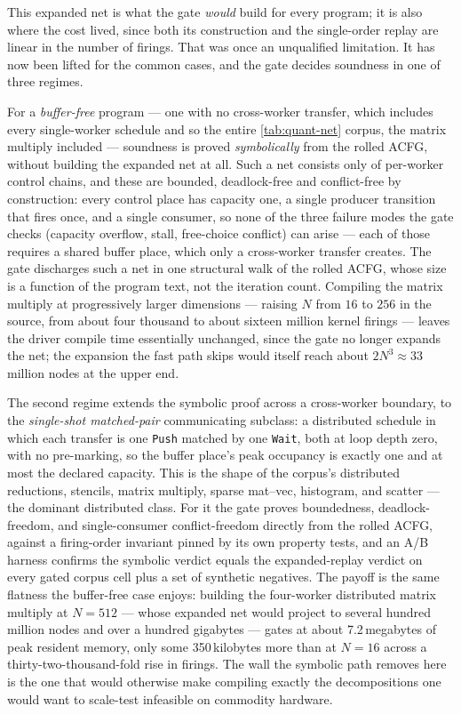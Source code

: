 This expanded net is what the gate \emph{would} build for every program; it is also
where the cost lived, since both its construction and the single-order replay are
linear in the number of firings. That was once an unqualified limitation. It has now
been lifted for the common cases, and the gate decides soundness in one of three regimes.

For a \emph{buffer-free} program --- one with no cross-worker transfer, which includes
every single-worker schedule and so the entire \cref{tab:quant-net} corpus, the matrix
multiply included --- soundness is proved \emph{symbolically} from the rolled ACFG,
without building the expanded net at all. Such a net consists only of per-worker control
chains, and these are bounded, deadlock-free and conflict-free by construction: every
control place has capacity one, a single producer transition that fires once, and a
single consumer, so none of the three failure modes the gate checks (capacity overflow,
stall, free-choice conflict) can arise --- each of those requires a shared buffer place,
which only a cross-worker transfer creates. The gate discharges such a net in one
structural walk of the rolled ACFG, whose size is a function of the program text, not the
iteration count. Compiling the matrix multiply at progressively larger dimensions ---
raising $N$ from $16$ to $256$ in the source, from about four thousand to about sixteen
million kernel firings --- leaves the driver compile time essentially unchanged, since
the gate no longer expands the net; the expansion the fast path skips would itself reach
about $2N^3 \approx 33$ million nodes at the upper end.

The second regime extends the symbolic proof across a cross-worker boundary, to the
\emph{single-shot matched-pair} communicating subclass: a distributed schedule in which
each transfer is one \texttt{Push} matched by one \texttt{Wait}, both at loop depth zero,
with no pre-marking, so the buffer place's peak occupancy is exactly one and at most the
declared capacity. This is the shape of the corpus's distributed reductions, stencils,
matrix multiply, sparse mat--vec, histogram, and scatter --- the dominant distributed
class. For it the gate proves boundedness, deadlock-freedom, and single-consumer
conflict-freedom directly from the rolled ACFG, against a firing-order invariant pinned
by its own property tests, and an A/B harness confirms the symbolic verdict equals the
expanded-replay verdict on every gated corpus cell plus a set of synthetic negatives.
The payoff is the same flatness the buffer-free case enjoys: building the four-worker
distributed matrix multiply at $N=512$ --- whose expanded net would project to several
hundred million nodes and over a hundred gigabytes --- gates at about 7.2\,megabytes of peak
resident memory, only some 350\,kilobytes more than at $N=16$ across a thirty-two-thousand-fold
rise in firings. The wall the symbolic path removes here is the one that would otherwise
make compiling exactly the decompositions one would want to scale-test infeasible on
commodity hardware.

